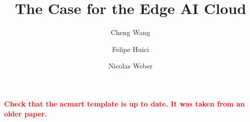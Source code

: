 \documentclass[10pt,sigconf]{acmart}
\newcommand{\TODO}[1]{\textbf{\textcolor{red}{#1}}}
\begin{document}
\title{The Case for the Edge AI Cloud}

\author{Cheng Wang}
\author{Felipe Huici}
\author{Nicolas Weber}

\begin{abstract}

\end{abstract}





\maketitle

\TODO{Check that the acmart template is up to date. It was taken from an older paper.}










\end{document}
